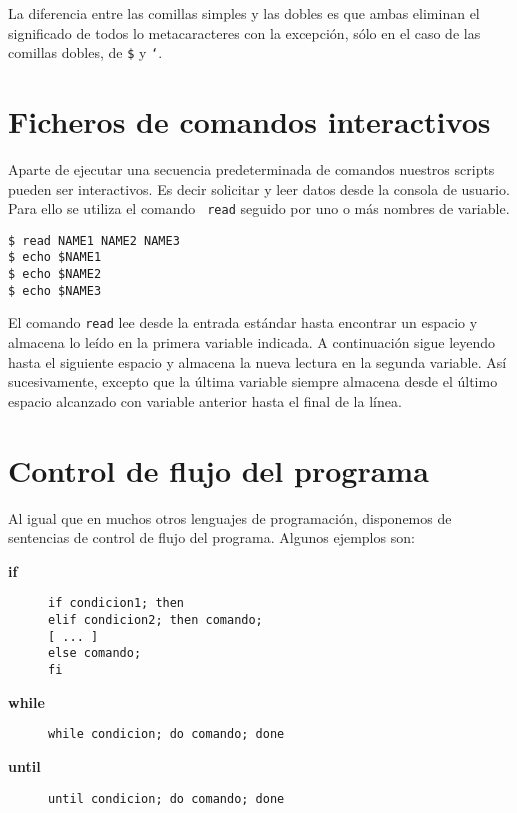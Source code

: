 La diferencia  entre las comillas  simples y  las dobles es  que ambas
eliminan el significado  de todos lo metacaracteres  con la excepción,
sólo en el caso de las comillas dobles, de {\tt \$} y {\tt `}.


\section{Ficheros de comandos interactivos}

Aparte de ejecutar una  secuencia predeterminada de comandos nuestros
scripts  pueden ser  interactivos.  Es decir  solicitar  y leer  datos
desde la  consola de  usuario. Para  ello se  utiliza el  comando {\tt
read} seguido por uno o más nombres de variable.

\begin{verbatim}
$ read NAME1 NAME2 NAME3
$ echo $NAME1
$ echo $NAME2
$ echo $NAME3
\end{verbatim}

El comando {\tt read} lee desde la entrada estándar hasta encontrar un
espacio  y  almacena lo  leído  en  la  primera variable  indicada.  A
continuación sigue  leyendo hasta el  siguiente espacio y  almacena la
nueva lectura en  la segunda variable. Así  sucesivamente, excepto que
la última variable siempre almacena  desde el último espacio alcanzado
con variable anterior hasta el final de la línea.


\section{Control de flujo del programa}

Al igual que en muchos  otros lenguajes de programación, disponemos de
sentencias de control de flujo del programa. Algunos ejemplos son:

\begin{description}

\item[{\bf if}]
\begin{verbatim}
if condicion1; then 
elif condicion2; then comando;
[ ... ]
else comando;
fi
\end{verbatim}

\item[{\bf while}] {\tt while condicion; do comando; done}

\item[{\bf until}] {\tt until condicion; do comando; done}

\end{description}

